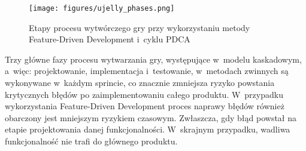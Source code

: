 \begin{figure}
\begin{center}
\texttt{[image: figures/ujelly\_phases.png]}
\caption{Etapy procesu wytwórczego gry przy wykorzystaniu metody Feature-Driven Development i~cyklu PDCA}
\label{ujelly_phases}
\end{center}
\end{figure}

Trzy główne fazy procesu wytwarzania gry, występujące w~modelu kaskadowym, a~więc: projektowanie, implementacja i~testowanie, w~metodach zwinnych są wykonywane w~każdym sprincie, co znacznie zmniejsza ryzyko powstania krytycznych błędów po zaimplementowaniu całego produktu. W~przypadku wykorzystania Feature-Driven Development proces naprawy błędów również obarczony jest mniejszym ryzykiem czasowym. Zwłaszcza, gdy błąd powstał na etapie projektowania danej funkcjonalności. W~skrajnym przypadku, wadliwa funkcjonalność nie trafi do głównego produktu.
